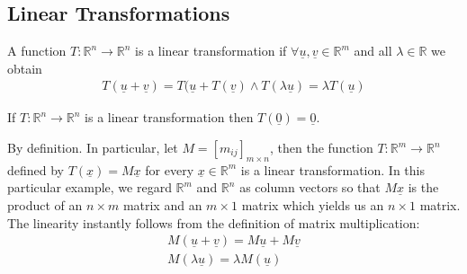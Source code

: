 \documentclass[a4paper]{article}
\theoremstyle{plain}
\newtheorem*{cor}{Corollary}
\theoremstyle{definition}
\newtheorem{defn}{Definition}[section]
\theoremstyle{remark}
\begin{document}
\subsection{Linear Transformations}
\begin{tcolorbox}[colback=black!3!white,colframe=black!60!white,title=\begin{defn}Linear Transformation \label{Linear Transformation}\end{defn}]
A function $T : \mathbb{R}^{n}\to \mathbb{R}^{n}$ is a linear transformation if $\forall \underline{u},\underline{v} \in \mathbb{R}^{m} $ and all $\lambda \in \mathbb{R}$ we obtain
\begin{align}
T(\underline{u} + \underline{v}) = T(\underline{u} + T(\underline{v}) \land T(\lambda \underline{u}) = \lambda T (\underline{u})
\end{align}
\end{tcolorbox}
\begin{tcolorbox}[colback=black!3!white,colframe=black!60!white,title=\begin{cor}Zero vector \label{Zero vector}\end{cor}]
        If $T : \mathbb{R}^{n}\to \mathbb{R}^{n}$ is a linear transformation then $T(\underline{0}) = \underline{0}$.
\end{tcolorbox}
\begin{tcolorbox}[colback=black!3!white,colframe=black!60!white,title=\begin{cor}Every matrix defines a linear transformation \label{Every matrix defines a linear transformation}\end{cor}]
        By definition. In particular, let $M = [m_{ij}]_{m \times n}$, then the function $T:\mathbb{R}^{m} \to \mathbb{R}^{n}$ defined by $T(\underline{x}) = M \underline{x}$ for every $\underline{x} \in \mathbb{R}^{m}$ is a linear transformation. In this particular example, we regard $\mathbb{R}^{m}$ and $\mathbb{R}^{n}$ as column vectors so that $M\underline{x}$ is the product of an $n \times m$ matrix and an $m \times 1$ matrix which yields us an $n \times 1$ matrix. The linearity instantly follows from the definition of matrix multiplication: 
                \begin{align}
                M(\underline{u} + \underline{v}) = M\underline{u} + M \underline{v} \\
		M(\lambda\underline{u}) = \lambda M (\underline{u})
                \end{align}
\end{tcolorbox}
\end{document}
